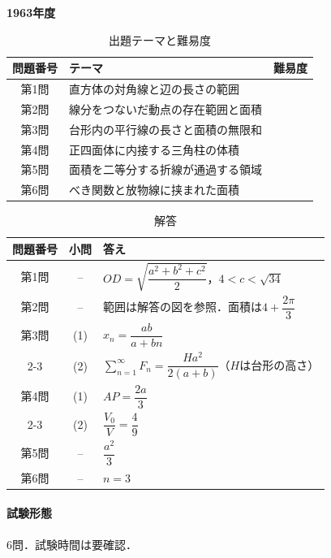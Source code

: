 \documentclass[../../main.tex]{subfiles}
\begin{document}
\begin{center}
  {\fontsize{48pt}{58pt}\selectfont \textbf{1963}\normalsize\textbf{年度}}
\end{center}

\begin{table}[htb]
  \centering
  \caption{出題テーマと難易度}
  \begin{tabular}{|c|p{9cm}|c|}
    \hline
    \textbf{問題番号} & \textbf{テーマ} & \textbf{難易度} \\
    \hline
    第1問 & 直方体の対角線と辺の長さの範囲 & \\
    \hline
    第2問 & 線分をつないだ動点の存在範囲と面積 & \\
    \hline
    第3問 & 台形内の平行線の長さと面積の無限和 & \\
    \hline
    第4問 & 正四面体に内接する三角柱の体積 & \\
    \hline
    第5問 & 面積を二等分する折線が通過する領域 & \\
    \hline
    第6問 & べき関数と放物線に挟まれた面積 & \\
    \hline
  \end{tabular}
\end{table}

\begin{table}[htb]
  \centering
  \caption{解答}
  \renewcommand{\arraystretch}{1.4}
  \begin{tabular}{|c|c|p{9cm}|}
    \hline
    \textbf{問題番号} & \textbf{小問} & \textbf{答え} \\
    \hline
    第1問 & -- & $OD=\sqrt{\dfrac{a^2+b^2+c^2}{2}}$，$4<c<\sqrt{34}$ \\
    \hline
    第2問 & -- & 範囲は解答の図を参照．面積は$4+\dfrac{2\pi}{3}$ \\
    \hline
    第3問 & (1) & $x_n=\dfrac{ab}{a+bn}$ \\
    \cline{2-3}
    & (2) & $\displaystyle\sum_{n=1}^{\infty}F_n=\dfrac{Ha^2}{2(a+b)}$（$H$は台形の高さ） \\
    \hline
    第4問 & (1) & $AP=\dfrac{2a}{3}$ \\
    \cline{2-3}
    & (2) & $\dfrac{V_0}{V}=\dfrac{4}{9}$ \\
    \hline
    第5問 & -- & $\dfrac{a^2}{3}$ \\
    \hline
    第6問 & -- & $n=3$ \\
    \hline
  \end{tabular}
\end{table}

\paragraph{試験形態}
6問．試験時間は要確認．
\end{document}

